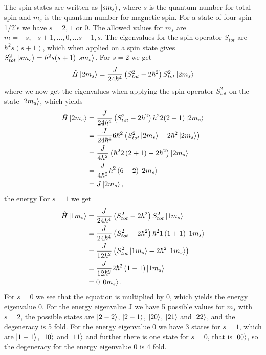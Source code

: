 \documentclass[a4paper,10pt]{article}
\begin{document}
\subsection{ }
The spin states are written as $\ket{sm_s}$, where $s$ is the quantum number for total spin and $m_s$ is the quantum number for magnetic spin. For a state of four spin-1/2's we have $s = 2$, $1$ or $0$. The allowed values for $m_s$ are $m = -s, -s+1, \dots, 0, \dots s-1, s$. The eigenvalues for the spin operator $S_{tot}$ are $\hbar^2s(s+1)$, which when applied on a spin state gives $S_{tot}^2\ket{sm_s} = \hbar^2s(s+1)\ket{sm_s}$. For $s = 2$ we get
%
\begin{align*}
\hat{H}\ket{2m_s} = \frac{J}{24\hbar^4}\left(S_{tot}^2 - 2\hbar^2\right)S_{tot}^2\ket{2m_s} 
\end{align*}
%
where we now get the eigenvalues when applying the spin operator $S_{tot}^2$ on the state $\ket{2m_s}$, which yields
%
\begin{align*}
\hat{H}\ket{2m_s} &= \frac{J}{24\hbar^4}\left(S_{tot}^2 - 2\hbar^2\right)\hbar^22(2+1)\ket{2m_s} \\
&= \frac{J}{24\hbar^4} 6\hbar^2\left(S_{tot}^2\ket{2m_s} - 2\hbar^2\ket{2m_s}\right) \\
&= \frac{J}{4\hbar^2}\left(\hbar^2 2\left(2 + 1\right) - 2\hbar^2\right)\ket{2m_s} \\
&= \frac{J}{4\hbar^2}\hbar^2\left(6-2\right)\ket{2m_s} \\
&= J\ket{2m_s},
\end{align*}
the energy 
%
For $s = 1$ we get
%
\begin{align*}
\hat{H}\ket{1m_s} &= \frac{J}{24\hbar^4}\left(S_{tot}^2 - 2\hbar^2\right)S_{tot}^2\ket{1m_s}  \\
&= \frac{J}{24\hbar^4}\left(S_{tot}^2 - 2\hbar^2\right)\hbar^2 1\left(1+1\right)\ket{1m_s} \\
&= \frac{J}{12\hbar^2}\left(S_{tot}^2\ket{1m_s} - 2\hbar^2\ket{1m_s}\right) \\
&= \frac{J}{12\hbar^2}2\hbar^2\left(1-1\right)\ket{1m_s} \\
&= 0\ket{0m_s}.
\end{align*}
%
For $s=0$ we see that the equation is multiplied by $0$, which yields the energy eigenvalue 0.
For the energy eigenvalue J we have 5 possible values for $m_s$ with $s=2$, the possible states are $\ket{2-2}$, $\ket{2-1}$, $\ket{20}$, $\ket{21}$ and $\ket{22}$, and the degeneracy is 5 fold. For the energy eigenvalue 0 we have 3 states for $s=1$, which are $\ket{1-1}$, $\ket{10}$ and $\ket{11}$ and further there is one state for $s=0$, that is $\ket{00}$, so the degeneracy for the energy eigenvalue 0 is 4 fold.
\end{document}
